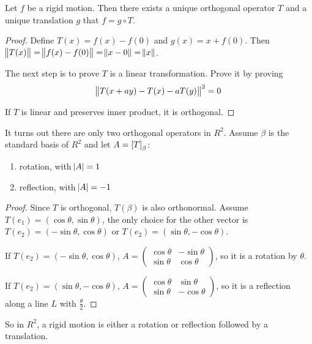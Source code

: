 \begin{theorem}
    Let $f$ be a rigid motion. Then there exists a unique orthogonal operator $T$ and a unique translation $g$ that $f = g  \circ T$.
\end{theorem}
\begin{proof}
    Define $T(x) = f(x) - f(0)$ and $g(x) = x + f(0)$. Then $\norm{T(x)} = \norm{f(x) - f(0)} = \norm{x - 0} = \norm{x}$.
    
    The next step is to prove $T$ is a linear transformation. Prove it by proving 
    \begin{equation*}
        \norm{T(x + a y) - T(x) - aT(y)}^2 = 0
    \end{equation*}
    
    If $T$ is linear and preserves inner product, it is orthogonal.
\end{proof}


It turns out there are only two orthogonal operators in $R^2$. Assume $\beta$ is the standard basis of $R^2$ and let $A = \coordinate{T}_\beta$:
\begin{enumerate}
    \item rotation, with $\abs{A} = 1$
    \item reflection, with $\abs{A} = -1$
\end{enumerate}
\begin{proof}
    Since $T$ is orthogonal, $T(\beta)$ is also orthonormal. Assume $T(e_1) = (\cos \theta, \sin \theta)$, the only choice for the other vector is $T(e_2) = (- \sin \theta, \cos \theta)$ or $T(e_2) = (\sin \theta, - \cos \theta)$.
    
    If $T(e_2) = (- \sin \theta, \cos \theta)$, $A = \begin{pmatrix}
                \cos \theta & - \sin \theta \\
        \sin \theta & \cos \theta
    \end{pmatrix}$, so it is a rotation by $\theta$.
    
    If $T(e_2) = (\sin \theta, - \cos \theta)$, $A = \begin{pmatrix}
        \cos \theta & \sin \theta \\
        \sin \theta & -\cos \theta
    \end{pmatrix}$, so it is a reflection along a line $L$ with $\displaystyle \frac{\theta}{2}$.
\end{proof}

So in $R^2$, a rigid motion is either a rotation or reflection followed by a translation.

